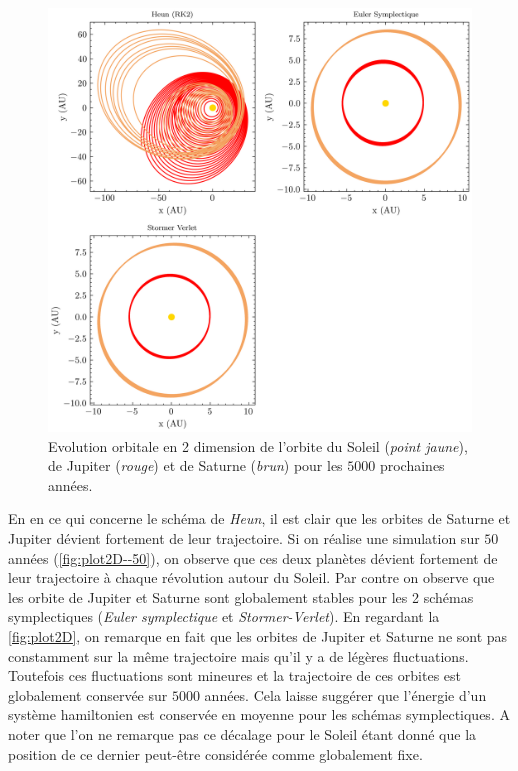 \documentclass[11pt,twoside=semi,openright,numbers=noenddot]{article}
\begin{document}
\begin{figure}[H]
    \centering
    \includegraphics{figures/5000_years/orbital-plot2d.png}
    \caption{Evolution orbitale en 2 dimension de l'orbite du Soleil (\emph{point jaune}), de Jupiter (\emph{rouge}) et de Saturne (\emph{brun}) pour les $5000$ prochaines années.}
    \label{fig:plot2D--5000}
\end{figure}

En en ce qui concerne le schéma de \emph{Heun}, il est clair que les orbites de Saturne et Jupiter dévient fortement de leur trajectoire. Si on réalise une simulation sur $50$ années (\autoref{fig:plot2D--50}), on observe que ces deux planètes dévient fortement de leur trajectoire à chaque révolution autour du Soleil.
Par contre on observe que les orbite de Jupiter et Saturne sont globalement stables pour les 2 schémas symplectiques (\emph{Euler symplectique} et \emph{Stormer-Verlet}). En regardant la \autoref{fig:plot2D}, on remarque en fait que les orbites de Jupiter et Saturne ne sont pas constamment sur la même trajectoire mais qu'il y a de légères fluctuations. Toutefois ces fluctuations sont mineures et la trajectoire de ces orbites est globalement conservée sur $5000$ années. Cela laisse suggérer que l'énergie d'un système hamiltonien est conservée en moyenne pour les schémas symplectiques. A noter que l'on ne remarque pas ce décalage pour le Soleil étant donné que la position de ce dernier peut-être considérée comme globalement fixe.
\end{document}
